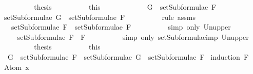 \begin{isabellebody}
\ \ \ \ \ \ \isamarkupfalse%
\ \isamarkupfalse%
\ {\isacharquery}thesis\isanewline
\ \ \ \ \ \ \ \ \isamarkupfalse%
\ this\isanewline
\ \ \ \ \isamarkupfalse%
\isanewline
\ \ \ \ \ \ \isamarkupfalse%
\ {\isachardoublequoteopen}G\ {\isasymin}\ setSubformulae\ F{}{\isachardoublequoteclose}\isanewline
\ \ \ \ \ \ \isamarkupfalse%
\ \isamarkupfalse%
\ {\isachardoublequoteopen}setSubformulae\ G\ {\isasymsubseteq}\ setSubformulae\ F{}{\isachardoublequoteclose}\isanewline
\ \ \ \ \ \ \ \ \isamarkupfalse%
\ {\isacharparenleft}rule\ assms{\isacharparenleft}{}{\isacharparenright}{\isacharparenright}\isanewline
\ \ \ \ \ \ \isamarkupfalse%
\ \isamarkupfalse%
\ {\isachardoublequoteopen}{\isasymdots}\ {\isasymsubseteq}\ setSubformulae\ F{}\ {\isasymunion}\ setSubformulae\ F{}{\isachardoublequoteclose}\isanewline
\ \ \ \ \ \ \ \ \isamarkupfalse%
\ {\isacharparenleft}simp\ only{\isacharcolon}\ Un{\isacharunderscore}upper{}{\isacharparenright}\isanewline
\ \ \ \ \ \ \isamarkupfalse%
\ \isamarkupfalse%
\ {\isachardoublequoteopen}{\isasymdots}\ {\isasymsubseteq}\ setSubformulae\ {\isacharparenleft}F{}\ \isactrlbold {\isasymrightarrow}\ F{}{\isacharparenright}{\isachardoublequoteclose}\isanewline
\ \ \ \ \ \ \ \ \isamarkupfalse%
\ {\isacharparenleft}simp\ only{\isacharcolon}\ setSubformulae{\isacharunderscore}imp\ Un{\isacharunderscore}upper{}{\isacharparenright}\isanewline
\ \ \ \ \ \ \isamarkupfalse%
\ \isamarkupfalse%
\ {\isacharquery}thesis\isanewline
\ \ \ \ \ \ \ \ \isamarkupfalse%
\ this\isanewline
\ \ \ \ \isamarkupfalse%
\isanewline
\ \ \isamarkupfalse%
\isanewline
{}\isamarkupfalse%
%
\endisatagproof
{\isafoldproof}%
%
\isadelimproof
\isanewline
%
\endisadelimproof
\isanewline
{}\isamarkupfalse%
\isanewline
\ \ {\isachardoublequoteopen}G\ {\isasymin}\ setSubformulae\ F\ {\isasymLongrightarrow}\ setSubformulae\ G\ {\isasymsubseteq}\ setSubformulae\ F{\isachardoublequoteclose}\isanewline
%
\isadelimproof
%
\endisadelimproof
%
\isatagproof
{}\isamarkupfalse%
\ {\isacharparenleft}induction\ F{\isacharparenright}\isanewline
\ \ \isamarkupfalse%
\ {\isacharparenleft}Atom\ x{\isacharparenright}\isanewline

\end{isabellebody}
